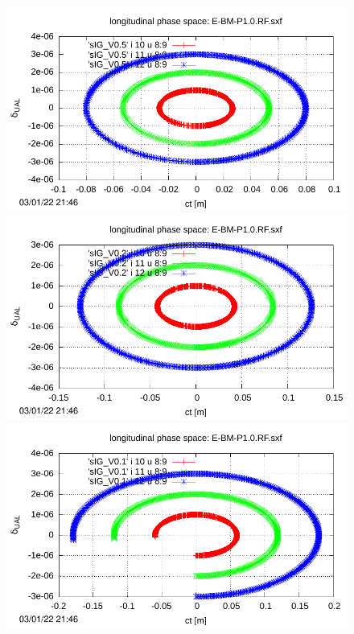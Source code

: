 \documentclass[]{article}
\begin{document}
\begin{figure}[h]
\begin{minipage}[b]{0.45\linewidth}
\end{minipage}
%
%
\begin{minipage}[b]{0.45\linewidth}
\centering
\includegraphics[scale=0.6]{pdf/delta_vs_ct_V0p5.pdf}
\end{minipage}
%
%
\begin{minipage}[b]{0.45\linewidth}
\centering
\includegraphics[scale=0.6]{pdf/delta_vs_ct_V0p2.pdf}
\end{minipage}
%
\hskip 1cm
%
\begin{minipage}[b]{0.45\linewidth}
\centering
\includegraphics[scale=0.6]{pdf/delta_vs_ct_V0p1.pdf}

\end{minipage}
\end{figure}
\end{document}
